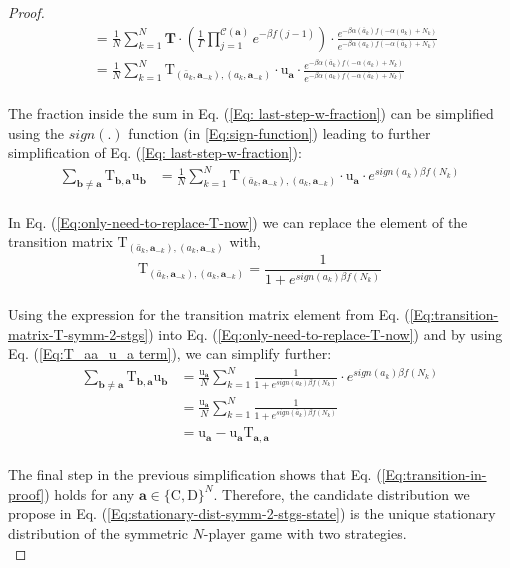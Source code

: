 \documentclass[11pt]{article}
\theoremstyle{plainCl1}
\theoremstyle{plainCl2}
\newcommand{\abf}{\mathbf{a}}
\newcommand{\bbf}{\mathbf{b}}
\newcommand{\T}{\mathbf{T}}
\newcommand{\C}{\mathrm{C}}
\newcommand{\D}{\mathrm{D}}
\begin{document}
\begin{proof}
\begin{align}
&= \frac{1}{N} \sum_{k=1}^N  \T \cdot \left( \frac{1}{\Gamma} \prod_{j=1}^{\mathcal{C}(\abf)} e^{-\beta f(j-1)}\right) \cdot \frac{e^{-\beta \alpha(\bar{a}_k)f(-\alpha(a_k)+ N_k)}}{e^{-\beta \alpha(a_k)f(-\alpha(\bar{a}_k) +N_k)}} \\[10pt]
&= \frac{1}{N} \sum_{k=1}^N  \mathrm{T}_{(\bar{a}_k, \abf_{-k}),(a_k, \abf_{-k})} \cdot \mathrm{u}_\abf \cdot \frac{e^{-\beta \alpha(\bar{a}_k)f(-\alpha(a_k)+ N_k)}}{e^{-\beta \alpha(a_k)f(-\alpha(\bar{a}_k) +N_k)}} \label{Eq: last-step-w-fraction} 
\end{align}
\\ \noindent The fraction inside the sum in  Eq. (\ref{Eq: last-step-w-fraction}) can be simplified using the $\mathit{sign}(.)$ function (in \ref{Eq:sign-function}) leading to further simplification of Eq. (\ref{Eq: last-step-w-fraction}):
\begin{align}
\sum_{\bbf \neq \abf} \mathrm{T}_{\bbf, \abf} \mathrm{u}_{\bbf} &= \frac{1}{N} \sum_{k=1}^N  \mathrm{T}_{(\bar{a}_k, \abf_{-k}),(a_k, \abf_{-k})} \cdot \mathrm{u}_\abf \cdot e^{sign(a_k) \beta f(N_k)} 
\label{Eq:only-need-to-replace-T-now}
\end{align}
\\ \noindent In Eq. (\ref{Eq:only-need-to-replace-T-now}) we can replace the element of the transition matrix $\mathrm{T}_{(\bar{a}_k, \abf_{-k}),(a_k, \abf_{-k})}$ with,
\begin{equation}
\mathrm{T}_{(\bar{a}_k, \abf_{-k}),(a_k, \abf_{-k})} = \frac{1}{1 + \displaystyle e^{\mathit{sign}(a_k) \beta f(N_k)}} 
\label{Eq:transition-matrix-T-symm-2-stgs}
\end{equation}
\\ \noindent Using the expression for the transition matrix element from Eq. (\ref{Eq:transition-matrix-T-symm-2-stgs}) into Eq. (\ref{Eq:only-need-to-replace-T-now}) and by using Eq. (\ref{Eq:T_aa_u_a term}), we can simplify further: 
\begin{align}
\sum_{\bbf \neq \abf} \mathrm{T}_{\bbf, \abf} \mathrm{u}_{\bbf} &= \frac{\mathrm{u}_\abf}{N} \sum_{k=1}^N \frac{1}{1 + \displaystyle e^{\mathit{sign}(a_k) \beta f(N_k)}} \cdot  e^{sign(a_k) \beta f(N_k)} \\[10pt]
&= \frac{\mathrm{u}_\abf}{N} \sum_{k=1}^N \frac{1}{1 + \displaystyle e^{\mathit{sign}(\bar{a}_k) \beta f(N_k)}}  \\[10pt]
&= \mathrm{u}_\abf - \mathrm{u}_\abf \mathrm{T}_{\abf,\abf}
\end{align}
\\ \noindent The final step in the previous simplification shows that Eq. (\ref{Eq:transition-in-proof}) holds for any $\abf \in \{\C,\D\}^N$. Therefore, the candidate distribution we propose in Eq. (\ref{Eq:stationary-dist-symm-2-stgs-state}) is the unique stationary distribution of the symmetric $N$-player game with two strategies. \\
\end{proof}
\end{document}
